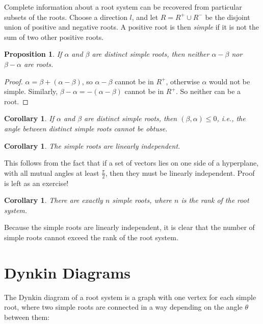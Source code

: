 \documentclass[10pt,a4paper]{article}
\newtheorem{prop}[theorem]{Proposition}
\newtheorem{cor}[theorem]{Corollary}
\begin{document}
Complete information about a root system can be recovered from particular subsets of the roots. Choose a direction $l$, and let $R = R^+ \cup R^-$ be the disjoint union of positive and negative roots. A positive root is then \emph{simple} if it is not the sum of two other positive roots.

\begin{prop}
If $\alpha$ and $\beta$ are distinct simple roots, then neither $\alpha - \beta$ nor $\beta - \alpha$ are roots.
\end{prop}
\begin{proof}
$\alpha = \beta + (\alpha - \beta)$, so $\alpha - \beta$ cannot be in $R^+$, otherwise $\alpha$ would not be simple. Similarly, $\beta - \alpha = -(\alpha - \beta)$ cannot be in $R^+$. So neither can be a root.
\end{proof}

\begin{cor}
If $\alpha$ and $\beta$ are distinct simple roots, then $(\beta, \alpha) \leq 0$, i.e., the angle between distinct simple roots cannot be obtuse.
\end{cor}
\begin{cor}
The simple roots are linearly independent.
\end{cor}

This follows from the fact that if a set of vectors lies on one side of a hyperplane, with all mutual angles at least $\frac{\pi}{2}$, then they must be linearly independent. Proof is left as an exercise!

\begin{cor}
There are exactly $n$ simple roots, where $n$ is the rank of the root system.
\end{cor}

Because the simple roots are linearly independent, it is clear that the number of simple roots cannot exceed the rank of the root system.

\section{Dynkin Diagrams}

The Dynkin diagram of a root system is a graph with one vertex for each simple root, where two simple roots are connected in a way depending on the angle $\theta$ between them:
\end{document}
